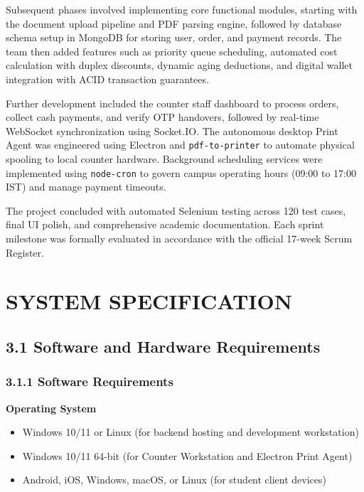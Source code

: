 \documentclass[12pt,a4paper]{report}
\begin{document}
Subsequent phases involved implementing core functional modules, starting with the document upload pipeline and PDF parsing engine, followed by database schema setup in MongoDB for storing user, order, and payment records. The team then added features such as priority queue scheduling, automated cost calculation with duplex discounts, dynamic aging deductions, and digital wallet integration with ACID transaction guarantees.

Further development included the counter staff dashboard to process orders, collect cash payments, and verify OTP handovers, followed by real-time WebSocket synchronization using Socket.IO. The autonomous desktop Print Agent was engineered using Electron and \texttt{pdf-to-printer} to automate physical spooling to local counter hardware. Background scheduling services were implemented using \texttt{node-cron} to govern campus operating hours (09:00 to 17:00 IST) and manage payment timeouts.

The project concluded with automated Selenium testing across 120 test cases, final UI polish, and comprehensive academic documentation. Each sprint milestone was formally evaluated in accordance with the official 17-week Scrum Register.

\newpage
\chapter{SYSTEM SPECIFICATION}

\section{3.1 Software and Hardware Requirements}

\subsection{3.1.1 Software Requirements}
\noindent\textbf{Operating System}
\begin{itemize}[leftmargin=0.35in, itemsep=2pt]
  \item Windows 10/11 or Linux (for backend hosting and development workstation)
  \item Windows 10/11 64-bit (for Counter Workstation and Electron Print Agent)
  \item Android, iOS, Windows, macOS, or Linux (for student client devices)
\end{itemize}
\end{document}
